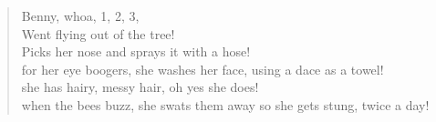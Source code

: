 \documentclass[11pt]{article}
\begin{document}
    \begin{verse}
        Benny, whoa, 1, 2, 3, \\
        Went flying out of the tree!\\
        Picks her nose and sprays it with a hose!\\
        for her eye boogers, she washes her face, using a dace as a towel!\\
        she has hairy, messy hair, oh yes she does!\\

        when the bees buzz, she swats them away so she gets stung, twice a day!\\
    \end{verse}
\end{document}
